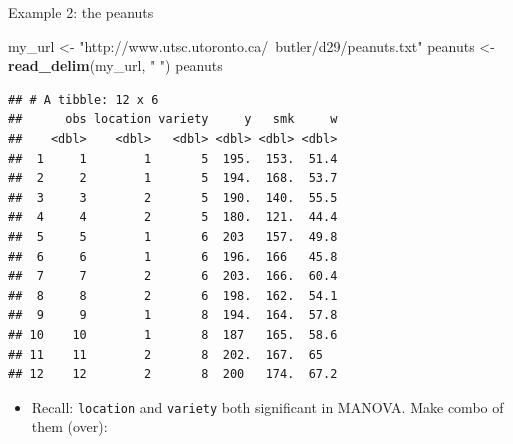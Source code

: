 \documentclass[ignorenonframetext,]{beamer}
\newenvironment{Shaded}{\begin{snugshade}}{\end{snugshade}}
\newcommand{\KeywordTok}[1]{\textcolor[rgb]{0.13,0.29,0.53}{\textbf{#1}}}
\newcommand{\NormalTok}[1]{#1}
\newcommand{\StringTok}[1]{\textcolor[rgb]{0.31,0.60,0.02}{#1}}
\providecommand{\tightlist}{%
  \setlength{\itemsep}{0pt}\setlength{\parskip}{0pt}}
\begin{document}
\begin{frame}[fragile]{Example 2: the peanuts}
\protect\hypertarget{example-2-the-peanuts}{}

\scriptsize

\begin{Shaded}
\begin{Highlighting}[]
\NormalTok{my_url <-}\StringTok{ "http://www.utsc.utoronto.ca/~butler/d29/peanuts.txt"}
\NormalTok{peanuts <-}\StringTok{ }\KeywordTok{read_delim}\NormalTok{(my_url, }\StringTok{" "}\NormalTok{)}
\NormalTok{peanuts}
\end{Highlighting}
\end{Shaded}

\begin{verbatim}
## # A tibble: 12 x 6
##      obs location variety     y   smk     w
##    <dbl>    <dbl>   <dbl> <dbl> <dbl> <dbl>
##  1     1        1       5  195.  153.  51.4
##  2     2        1       5  194.  168.  53.7
##  3     3        2       5  190.  140.  55.5
##  4     4        2       5  180.  121.  44.4
##  5     5        1       6  203   157.  49.8
##  6     6        1       6  196.  166   45.8
##  7     7        2       6  203.  166.  60.4
##  8     8        2       6  198.  162.  54.1
##  9     9        1       8  194.  164.  57.8
## 10    10        1       8  187   165.  58.6
## 11    11        2       8  202.  167.  65  
## 12    12        2       8  200   174.  67.2
\end{verbatim}

\normalsize

\begin{itemize}
\tightlist
\item
  Recall: \texttt{location} and \texttt{variety} both significant in
  MANOVA. Make combo of them (over):
\end{itemize}

\end{frame}
\end{document}
